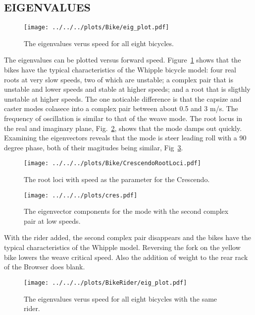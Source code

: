 \documentclass{bmd2010p}
\begin{document}
\subsection{EIGENVALUES}
\begin{figure}[tbp]
    \centering
    \texttt{[image: ../../../plots/Bike/eig\_plot.pdf]}
    \caption{The eigenvalues verus speed for all eight bicycles.}
    \label{fig:bikeEigPlot}
\end{figure}
The eigenvalues can be plotted versus forward speed.
Figure~\ref{fig:bikeEigPlot} shows that the bikes have the typical
characteristics of the Whipple bicycle model: four real roots at very slow
speeds, two of which are unstable; a complex pair that is unstable and lower
speeds and stable at higher speeds; and a root that is sligthly unstable at
higher speeds. The one noticable difference is that the capsize and caster
modes colasece into a complex pair between about 0.5 and 3 m/s. The frequency
of oscillation is similar to that of the weave mode. The root locus in the real
and imaginary plane, Fig.~\ref{fig:rootloci}, shows that the mode damps out
quickly. Examining the eigenvectors reveals that the mode is steer leading
roll with a 90 degree phase, both of their magitudes being similar,
Fig~\ref{fig:evec}.
\begin{figure}[tbp]
    \begin{center}
        \texttt{[image: ../../../plots/Bike/CrescendoRootLoci.pdf]}
    \end{center}
    \caption{The root loci with speed as the parameter for the Crescendo.}
    \label{fig:rootloci}
\end{figure}
\begin{figure}[tbp]
    \begin{center}
        \texttt{[image: ../../../plots/cres.pdf]}
    \end{center}
    \caption{The eigenvector components for the mode with the second complex
    pair at low speeds.}
    \label{fig:evec}
\end{figure}
With the rider added, the second complex pair disappears and the bikes have the
typical characteristics of the Whipple model. Reversing the fork on the yellow
bike lowers the weave critical speed. Also the addition of weight to the rear
rack of the Browser does blank.
\begin{figure}[tbp]
    \centering
    \texttt{[image: ../../../plots/BikeRider/eig\_plot.pdf]}
    \caption{The eigenvalues verus speed for all eight bicycles with the same
    rider.}
    \label{fig:bikeRiderEigPlot}
\end{figure}
\end{document}
